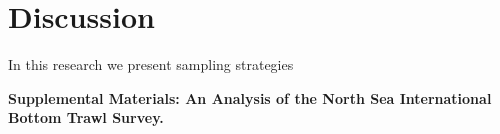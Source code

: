 \documentclass[a4paper 12pt]{article}
\numberwithin{equation}{section}
\renewcommand{\theequation} {\arabic{section}.\arabic{equation}}
\begin{document}
\clearpage
\section{Discussion}
\label{sec:discussion}

In this research we present sampling strategies 

%
%
%
%
%
%








\clearpage




\clearpage


\begin{center}
\textbf{\Large Supplemental Materials: An Analysis of the North Sea International Bottom Trawl Survey.}
\end{center}
\setcounter{section}{0}
\setcounter{equation}{0}
\setcounter{figure}{0}
\setcounter{table}{0}
\setcounter{page}{1}
\makeatletter
\renewcommand{\thesection}{S\arabic{section}}
\renewcommand{\theequation}{S\arabic{section}.\arabic{equation}}
\renewcommand{\thefigure}{S\arabic{figure}}
\renewcommand{\bibnumfmt}[1]{[S#1]}
\renewcommand{\citenumfont}[1]{S#1}
\end{document}
